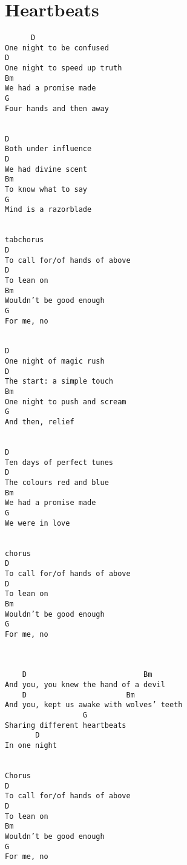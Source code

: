 \documentclass[leqno]{memoir}
\begin{document}
\chapter{Heartbeats}
\begin{verbatim}
	  D 
One night to be confused 
D 
One night to speed up truth 
Bm 
We had a promise made 
G 
Four hands and then away 


D 
Both under influence 
D 
We had divine scent 
Bm 
To know what to say 
G 
Mind is a razorblade 


tabchorus
D 
To call for/of hands of above 
D
To lean on
Bm
Wouldn’t be good enough
G
For me, no


D 
One night of magic rush 
D 
The start: a simple touch 
Bm 
One night to push and scream 
G 
And then, relief 


D 
Ten days of perfect tunes 
D 
The colours red and blue 
Bm 
We had a promise made 
G 
We were in love 


chorus
D
To call for/of hands of above
D
To lean on
Bm
Wouldn’t be good enough
G
For me, no



    D                           Bm 
And you, you knew the hand of a devil 
    D                       Bm 
And you, kept us awake with wolves’ teeth 
                  G 
Sharing different heartbeats 
       D 
In one night 


Chorus
D
To call for/of hands of above
D
To lean on
Bm
Wouldn’t be good enough
G
For me, no 
\end{verbatim}
\newpage
\end{document}
